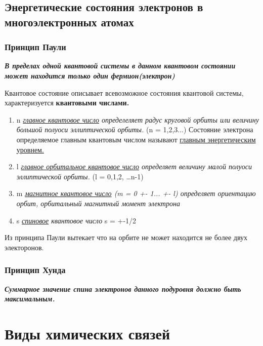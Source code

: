 \documentclass[../main.tex]{subfiles}
\begin{document}
\subsection{Энергетические состояния электронов в многоэлектронных атомах}

\subsubsection{Принцип Паули}
\begin{center}
    \textbf{\textit{В пределах одной квантовой системы в данном квантовом состоянии может находится только один фермион(электрон)}}
\end{center}
Квантовое состояние описывает всевозможное состояния квантовой системы, характеризуется \textbf{квантовыми числами.}
\begin {enumerate}
    \item n \textit{\underline{главное квантовое число} определеляет радус круговой орбиты или величину большой полуоси эллиптической орбиты.} (n = 1,2,3...)
Состояние электрона определяемое главным квантовым числом называют \underline{главным энергетическим уровнем.}

    \item l \textit{\underline{главное орбитальное квантовое число} определяет величину малой полуоси эллиптической орбиты.} (l = 0,1,2, \ldots n-1) 

    \item m \textit{\underline{магнитное квантовое число} (m = 0 +- 1... +- l) определяет ориентацию орбит, орбитальный магнитный момент электрона}

    \item s \textit{\underline{спиновое} квантовое число} s = +-1/2
\end{enumerate}

Из принципа Паули вытекает что на орбите не может находится не более двух электоронов.

\subsubsection{Принцип Хунда}
\begin{center}
    \textbf{\textit{Суммарное значение спина электронов данного подуровня должно быть максимальным.}}
\end{center}

\section{Виды химических связей}
\end{document}
